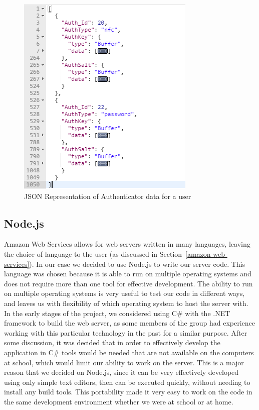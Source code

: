 \documentclass[12pt]{report}
\let\Oldsubsection\subsection
\renewcommand{\subsection}{\FloatBarrier\Oldsubsection}
\begin{document}
\begin{figure}
    \includegraphics[width=\textwidth]{Diagrams/Server_Diagrams/JSON}
    \caption{JSON Representation of Authenticator data for a user}
    \label{fig:json-authenticators}
\end{figure}

\subsection{Node.js} \label{node.js}

Amazon Web Services allows for web
servers written in many languages, leaving the choice of language to the user (as discussed in Section~\ref{amazon-web-services}).
In our case we
decided to use Node.js to write our server code. This language was chosen because it is able to
run on multiple operating systems and does not require more than one tool for effective development.
The ability to run on multiple operating systems is very useful to test our code in different ways,
and leaves us with flexibility of which operating system to host the server with. In the early
stages of the project, we considered using C\# with the .NET framework to build the web server,
as some members of the group had experience working with this particular technology in the past
for a similar purpose. After some discussion, it was decided that in order to effectively develop
the application in C\# tools would be needed that are not available on the computers at school,
which would limit our ability to work on the server. This is a major reason that we decided on
Node.js, since it can be very effectively developed using only simple text editors, then can be
executed quickly, without needing to install any build tools. This portability made it very easy to
work on the code in the same development environment whether we were at school or at home.
\end{document}
